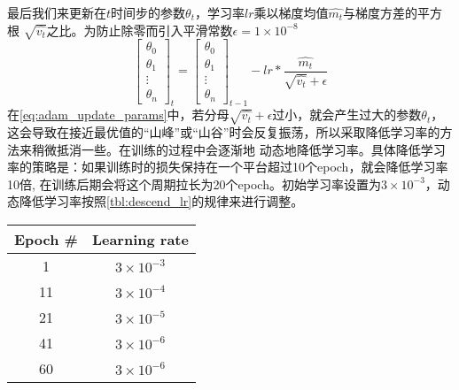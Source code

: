 \noindent{}最后我们来更新在$t$时间步的参数$\theta_{t}$，学习率$lr$乘以梯度均值$\widehat{m_t}$与梯度方差的平方根
$\sqrt{\widehat{v_t}}$之比。为防止除零而引入平滑常数$\epsilon = 1 \times {10}^{-8}$
\begin{equation}\label{eq:adam_update_params}
    \begin{bmatrix}
        \theta_{0} \\
        \theta_{1} \\
        \vdots \\
        \theta_{n}
    \end{bmatrix}_{t} = 
    \begin{bmatrix}
        \theta_{0} \\
        \theta_{1} \\
        \vdots \\
        \theta_{n}
    \end{bmatrix}_{t-1} -
    {lr} * \frac{\widehat{m_t}}{\sqrt{\widehat{v_t}} + \epsilon}
\end{equation}
在\autoref{eq:adam_update_params}中，若分母$\sqrt{\widehat{v_t}}+\epsilon$过小，就会产生过大的参数$\theta_{t}$，
这会导致在接近最优值的“山峰”或“山谷”时会反复振荡，所以采取降低学习率的方法来稍微抵消一些。在训练的过程中会逐渐地
动态地降低学习率。具体降低学习率的策略是：如果训练时的损失保持在一个平台超过10个epoch，就会降低学习率10倍, 
在训练后期会将这个周期拉长为20个epoch。初始学习率设置为$3 \times {10}^{-3}$，动态降低学习率按照\autoref{tbl:descend_lr}的规律来进行调整。
\begin{table}[!htp]
    \label{tbl:descend_lr}
    \centering
    \begin{tabular}{cc}
        \toprule
        Epoch \# & Learning rate \\
        \midrule
        1 & $3 \times {10}^{-3}$ \\
        11 & $3 \times {10}^{-4}$ \\
        21 & $3 \times {10}^{-5}$ \\
        41 & $3 \times {10}^{-6}$ \\
        60 & $3 \times {10}^{-6}$ \\
        \bottomrule
    \end{tabular}
\end{table}



